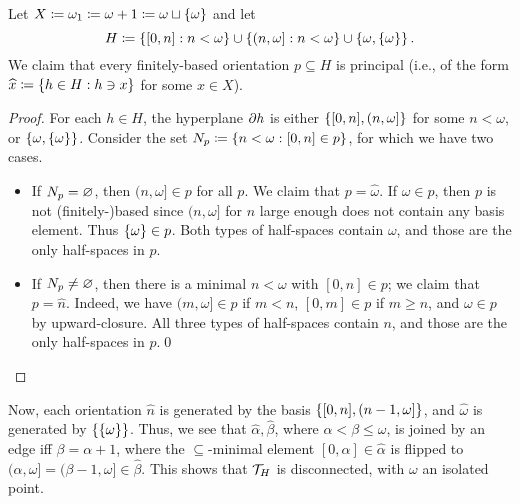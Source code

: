 \documentclass{amsart}
\begin{document}
    \begin{example}[Tserunyan]\label{line}
        Let $X\coloneqq\omega_1\coloneqq\omega+1\coloneqq\omega\sqcup\l\{\omega\r\}$ and let
        \begin{equation*}
            H\coloneqq\l\{[0,n]\st n<\omega\r\}\cup\l\{(n,\omega]\st n<\omega\r\}\cup\l\{\omega,\l\{\omega\r\}\r\}.
        \end{equation*}
        We claim that every finitely-based orientation $p\subseteq H$ is principal (i.e., of the form $\widehat{x}\coloneqq\l\{h\in H\st h\ni x\r\}$ for some $x\in X$).
        \begin{center}
            \vspace{0.05in}
            \begin{minipage}{0.9\textwidth}
                \begin{proof}
                    For each $h\in H$, the hyperplane $\del h$ is either $\l\{[0,n],(n,\omega]\r\}$ for some $n<\omega$, or $\l\{\omega,\l\{\omega\r\}\r\}$. Consider the set $N_p\coloneqq\l\{n<\omega\st[0,n]\in p\r\}$, for which we have two cases.
                    \begin{itemize}
                        \item If $N_p=\em$, then $(n,\omega]\in p$ for all $p$. We claim that $p=\widehat{\omega}$. If $\omega\in p$, then $p$ is not (finitely-)based since $(n,\omega]$ for $n$ large enough does not contain any basis element. Thus $\l\{\omega\r\}\in p$. Both types of half-spaces contain $\omega$, and those are the only half-spaces in $p$.
                        \item If $N_p\neq\em$, then there is a minimal $n<\omega$ with $[0,n]\in p$; we claim that $p=\widehat{n}$. Indeed, we have $(m,\omega]\in p$ if $m<n$, $[0,m]\in p$ if $m\geq n$, and $\omega\in p$ by upward-closure. All three types of half-spaces contain $n$, and those are the only half-spaces in $p$.\qed
                    \end{itemize}
                \end{proof}
            \end{minipage}
            \vspace{0.05in}
        \end{center}
        Now, each orientation $\widehat{n}$ is generated by the basis $\l\{[0,n],(n-1,\omega]\r\}$, and $\widehat{\omega}$ is generated by $\l\{\l\{\omega\r\}\r\}$. Thus, we see that $\widehat{\alpha},\widehat{\beta}$, where $\alpha<\beta\leq\omega$, is joined by an edge iff $\beta=\alpha+1$, where the $\subseteq$-minimal element $[0,\alpha]\in\widehat{\alpha}$ is flipped to $(\alpha,\omega]=(\beta-1,\omega]\in\widehat{\beta}$. This shows that $\mc{T}_H$ is disconnected, with $\omega$ an isolated point.
    \end{example}
\end{document}

